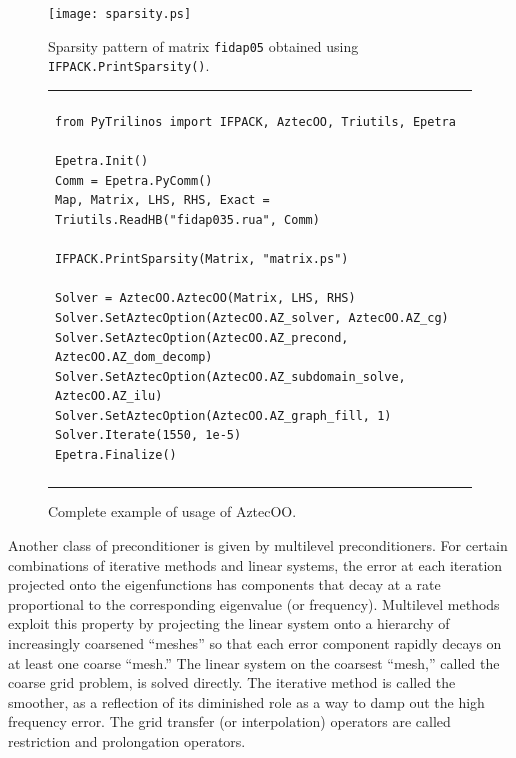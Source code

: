 \documentclass[acmtocl]{acmtrans2m}
\begin{document}
\begin{figure}
  \begin{center}
    \texttt{[image: sparsity.ps]}
    \caption{Sparsity pattern of matrix {\tt fidap05} obtained using
      {\tt IFPACK.PrintSparsity()}.}
    \label{fig:sparsity}
  \end{center}
\end{figure}

\begin{figure}
  \begin{center}
    \begin{tabular}{| p{12cm} |}
      \hline
      \\
      \footnotesize
      \begin{minipage}{11.5cm}
\begin{verbatim}
from PyTrilinos import IFPACK, AztecOO, Triutils, Epetra

Epetra.Init()
Comm = Epetra.PyComm()
Map, Matrix, LHS, RHS, Exact = Triutils.ReadHB("fidap035.rua", Comm)

IFPACK.PrintSparsity(Matrix, "matrix.ps")

Solver = AztecOO.AztecOO(Matrix, LHS, RHS)
Solver.SetAztecOption(AztecOO.AZ_solver, AztecOO.AZ_cg)
Solver.SetAztecOption(AztecOO.AZ_precond, AztecOO.AZ_dom_decomp)
Solver.SetAztecOption(AztecOO.AZ_subdomain_solve, AztecOO.AZ_ilu)
Solver.SetAztecOption(AztecOO.AZ_graph_fill, 1)
Solver.Iterate(1550, 1e-5)
Epetra.Finalize()
\end{verbatim}
      \end{minipage}
      \\
      \\
      \hline
    \end{tabular}
    \caption{Complete example of usage of AztecOO.}
    \label{fig:aztecoo}
  \end{center}
\end{figure}

\medskip

Another class of preconditioner is given by multilevel
preconditioners.  For certain combinations of iterative methods and
linear systems, the error at each iteration projected onto the
eigenfunctions has components that decay at a rate proportional to the
corresponding eigenvalue (or frequency).  Multilevel methods exploit
this property \cite{Briggs} by projecting the linear system onto a
hierarchy of increasingly coarsened ``meshes'' so that each error
component rapidly decays on at least one coarse ``mesh.''  The linear
system on the coarsest ``mesh,'' called the coarse grid problem, is
solved directly.  The iterative method is called the smoother, as a
reflection of its diminished role as a way to damp out the high
frequency error.  The grid transfer (or interpolation) operators are
called restriction and prolongation operators.
\end{document}
